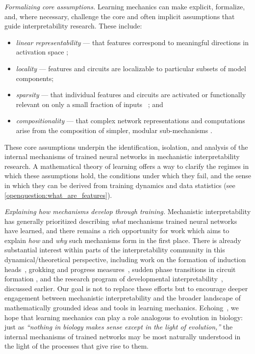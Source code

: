 \emph{Formalizing core assumptions.} Learning mechanics can make explicit, formalize, and, where necessary, challenge the core and often implicit assumptions that guide interpretability research.
These include:
\begin{itemize}
  \item \emph{linear representability} --- that features correspond to meaningful directions in activation space \citep{mikolov2013linguistic, park2023linear, nanda2023emergent, marks2023geometry, jiang2024origins, csordas2024recurrent};
  \item \emph{locality} --- features and circuits are localizable to particular subsets of model components\citep{meng2022locating, wang2022interpretability, conmy2023towards, arora2025language};
  \item \emph{sparsity} --- that individual features and circuits are activated or functionally relevant on only a small fraction of inputs ~\citep{cunningham2023sparse, bricken2023monosemanticity}; and
  \item \emph{compositionality} --- that complex network representations and computations arise from the composition of simpler, modular sub-mechanisms \citep{thorpe1989local,smolensky1990tensor,lepori2023break,schug2023discovering,ramesh2023compositional}.
\end{itemize}
These core assumptions underpin the identification, isolation, and analysis of the internal mechanisms of trained neural networks in mechanistic interpretability research.
A mathematical theory of learning offers a way to clarify the regimes in which these assumptions hold, the conditions under which they fail, and the sense in which they can be derived from training dynamics and data statistics (see \cref{openquestion:what_are_features}).



\emph{Explaining how mechanisms develop through training.} Mechanistic interpretability has generally prioritized describing \emph{what} mechanisms trained neural networks have learned,
and there remains a rich opportunity for work which aims to explain \emph{how} and \emph{why} such mechanisms form in the first place.
There is already substantial interest within parts of the interpretability community in this dynamical/theoretical perspective, including work on the formation of induction heads~\citep{elhage2021mathematical, olsson2022context}, grokking and progress measures~\citep{nanda2023progress}, sudden phase transitions in circuit formation \citep{elhage2022toy, chen2023sudden, gopalani2024abrupt,park2024emergence}, and the research program of developmental interpretability~\citep{hoogland2023developmental,hoogland2025loss}, discussed earlier.
Our goal is not to replace these efforts but to encourage deeper engagement between mechanistic interpretability and the broader landscape of mathematically grounded ideas and tools in learning mechanics.
Echoing~\cite{saphra2022creationism}, we hope that
learning mechanics can play a role analogous to evolution in biology: just as \emph{``nothing in biology makes sense except in the light of evolution,''} the internal mechanisms of trained networks may be most naturally understood in the light of the processes that give rise to them.


